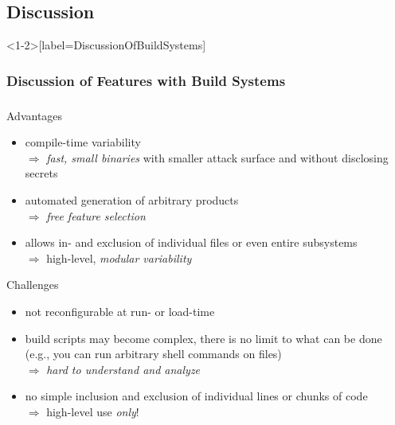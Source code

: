 \subsection{Discussion}
\newcommand{\MajorChallengesOfBuildSystems}{
	\item build scripts may become complex, there is no limit to what can be done (e.g., you can run arbitrary shell commands on files)\\
		$\Rightarrow$ \emph{hard to understand and analyze}
	\item no simple inclusion and exclusion of individual lines or chunks of code\\
	$\Rightarrow$ high-level use \emph{only}!
}
\begin{frame}<1-2>[label=DiscussionOfBuildSystems]
	\frametitle<1-2>{Discussion of Features with Build Systems}
	\frametitle<3>{\myframetitle}
	\begin{mycolumns}
		\begin{note}{Advantages}
			\begin{itemize}
				\item compile-time variability\\
					$\Rightarrow$ \emph{fast, small binaries} with smaller attack surface and without disclosing secrets
				\item automated generation of arbitrary products\\
					$\Rightarrow$ \emph{free feature selection}
				\item allows in- and exclusion of individual files or even entire subsystems\\
					$\Rightarrow$ high-level, \emph{modular variability}
			\end{itemize}
		\end{note}
	\mynextcolumn
		\begin{note}{Challenges}
			\begin{itemize}
				\item not reconfigurable at run- or load-time %
				\MajorChallengesOfBuildSystems
			\end{itemize}
		\end{note}
	\end{mycolumns}
\end{frame}
